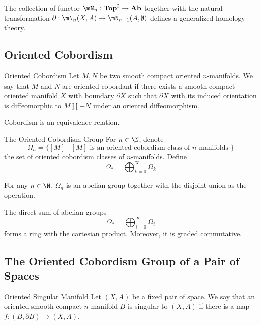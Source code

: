 \documentclass[a4paper]{article}
\begin{document}
\begin{thm}{}{} The collection of functor $\mN_n:\bold{Top}^2\to\bold{Ab}$ together with the natural transformation $\partial:\mN_n(X,A)\to\mN_{n-1}(A,\emptyset)$ defines a generalized homology theory. 
\end{thm}

\subsection{Oriented Cobordism}
\begin{defn}{Oriented Cobordism}{} Let $M,N$ be two smooth compact oriented $n$-manifolds. We say that $M$ and $N$ are oriented cobordant if there exists a smooth compact oriented manifold $X$ with boundary $\partial X$ such that $\partial X$ with its induced orientation is diffeomorphic to $M\coprod -N$ under an oriented diffeomorphism. 
\end{defn}

\begin{lmm}{}{} Cobordism is an equivalence relation. 
\end{lmm}

\begin{defn}{The Oriented Cobordism Group}{} For $n\in\N$, denote $$\Omega_n=\{[M]\;|\;[M]\text{ is an oriented cobordism class of }n\text{-manifolds }\}$$ the set of oriented cobordism classes of $n$-manifolds. Define $$\Omega_\ast=\bigoplus_{k=0}^\infty\Omega_k$$
\end{defn}

\begin{lmm}{}{} For any $n\in\N$, $\Omega_n$ is an abelian group together with the disjoint union as the operation. 
\end{lmm}

\begin{prp}{}{} The direct sum of abelian groups $$\Omega_\ast=\bigoplus_{i=0}^\infty\Omega_i$$ forms a ring with the cartesian product. Moreover, it is graded commutative. 
\end{prp}

\subsection{The Oriented Cobordism Group of a Pair of Spaces}
\begin{defn}{Oriented Singular Manifold}{} Let $(X,A)$ be a fixed pair of space. We say that an oriented smooth compact $n$-manifold $B$ is singular to $(X,A)$ if there is a map $f:(B,\partial B)\to(X,A)$. 
\end{defn}
\end{document}
